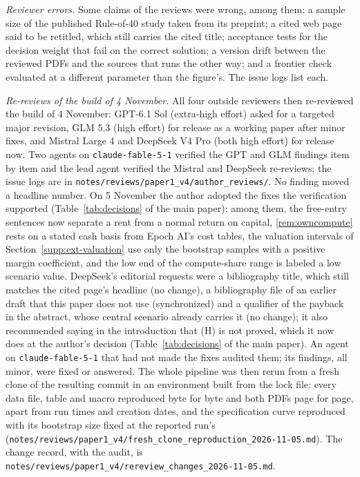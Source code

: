 \emph{Reviewer errors.} Some claims of the reviews were wrong, among them: a sample size of the published Rule-of-40 study taken from its preprint; a cited web page said to be retitled, which still carries the cited title; acceptance tests for the decision weight that fail on the correct solution; a version drift between the reviewed PDFs and the sources that runs the other way; and a frontier check evaluated at a different parameter than the figure's. The issue logs list each.

\emph{Re-reviews of the build of 4 November.} All four outside reviewers then re-reviewed the build of 4 November: GPT-6.1 Sol (extra-high effort) asked for a targeted major revision, GLM 5.3 (high effort) for release as a working paper after minor fixes, and Mistral Large 4 and DeepSeek V4 Pro (both high effort) for release now. Two agents on \texttt{claude-fable-5-1} verified the GPT and GLM findings item by item and the lead agent verified the Mistral and DeepSeek re-reviews; the issue logs are in \texttt{notes/reviews/paper1\_v4/\allowbreak author\_reviews/}. No finding moved a headline number. On 5 November the author adopted the fixes the verification supported (Table~\ref{tab:decisions} of the main paper): among them, the free-entry sentences now separate a rent from a normal return on capital, \autoref{rem:owncompute} rests on a stated cash basis from Epoch AI's cost tables, the valuation intervals of Section~\ref{supp:ext-valuation} use only the bootstrap samples with a positive margin coefficient, and the low end of the compute-share range is labeled a low scenario value. DeepSeek's editorial requests were a bibliography title, which still matches the cited page's headline (no change), a bibliography file of an earlier draft that this paper does not use (synchronized) and a qualifier of the payback in the abstract, whose central scenario already carries it (no change); it also recommended saying in the introduction that (H) is not proved, which it now does at the author's decision (Table~\ref{tab:decisions} of the main paper). An agent on \texttt{claude-fable-5-1} that had not made the fixes audited them; its findings, all minor, were fixed or answered. The whole pipeline was then rerun from a fresh clone of the resulting commit in an environment built from the lock file: every data file, table and macro reproduced byte for byte and both PDFs page for page, apart from run times and creation dates, and the specification curve reproduced with its bootstrap size fixed at the reported run's (\texttt{notes/reviews/paper1\_v4/\allowbreak fresh\_clone\_reproduction\_2026-11-05.md}). The change record, with the audit, is \texttt{notes/reviews/paper1\_v4/\allowbreak rereview\_changes\_2026-11-05.md}.

